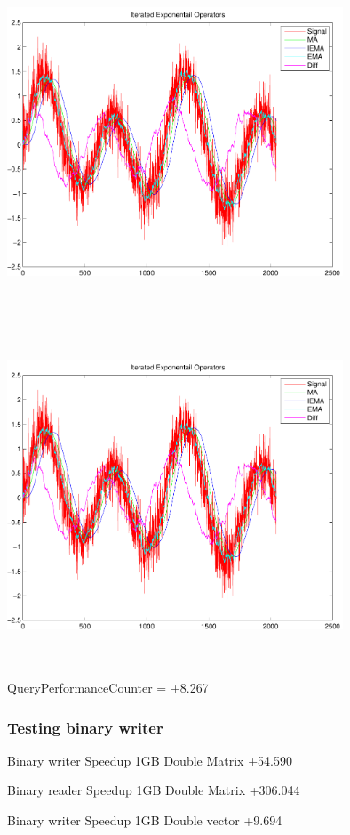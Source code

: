 \documentclass[9pt]{article}
\theoremstyle{plain}
\theoremstyle{definition}
\theoremstyle{remark}
\numberwithin{equation}{section}
\begin{document}
\includegraphics[width=10.0cm,height=10.0cm]{IteratedExponentailOperators.pdf}

\includegraphics[width=10.0cm,height=10.0cm]{IteratedExponentailOperators.pdf}

QueryPerformanceCounter  =  +8.267
\subsubsection{Testing binary writer}
Binary writer Speedup 1GB Double Matrix +54.590

Binary reader Speedup 1GB Double Matrix +306.044

Binary writer Speedup 1GB Double vector +9.694
\end{document}
